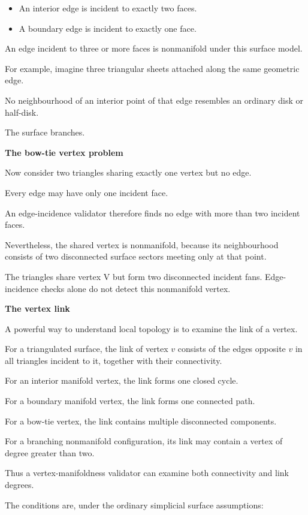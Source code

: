 \begin{itemize}
\tightlist
\item
  An interior edge is incident to exactly two faces.
\item
  A boundary edge is incident to exactly one face.
\end{itemize}

An edge incident to three or more faces is nonmanifold under this surface model.

For example, imagine three triangular sheets attached along the same geometric edge.

No neighbourhood of an interior point of that edge resembles an ordinary disk or half-disk.

The surface branches.

\textbf{The bow-tie vertex problem}

Now consider two triangles sharing exactly one vertex but no edge.

Every edge may have only one incident face.

An edge-incidence validator therefore finds no edge with more than two incident faces.

Nevertheless, the shared vertex is nonmanifold, because its neighbourhood consists of two disconnected surface sectors meeting only at that point.

The triangles share vertex V but form two disconnected incident fans. Edge-incidence checks alone do not detect this nonmanifold vertex.

\textbf{The vertex link}

A powerful way to understand local topology is to examine the link of a vertex.

For a triangulated surface, the link of vertex \(v\) consists of the edges opposite \(v\) in all triangles incident to it, together with their connectivity.

For an interior manifold vertex, the link forms one closed cycle.

For a boundary manifold vertex, the link forms one connected path.

For a bow-tie vertex, the link contains multiple disconnected components.

For a branching nonmanifold configuration, its link may contain a vertex of degree greater than two.

Thus a vertex-manifoldness validator can examine both connectivity and link degrees.

The conditions are, under the ordinary simplicial surface assumptions:


